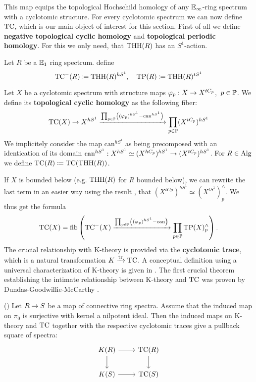 This map equips the topological Hochschild homology of any $\mathbb{E}_\infty$-ring spectrum with a cyclotomic structure. 
For every cyclotomic spectrum we can now define $\operatorname{TC}$, which is our main object of interest for this section.
First of all we define \textbf{negative topological cyclic homology} and \textbf{topological periodic  homology}. For this we only need, that $\operatorname{THH}(R)$ has an $S^1$-action.
\begin{defn}
    Let $R$ be a $\mathbb{E}_1$ ring spectrum. define
        \begin{equation*}
          \operatorname{TC}^{-}(R)\coloneqq \operatorname{THH}(R)^{hS^1},\quad   \operatorname{TP}(R)\coloneqq \operatorname{THH}(R)^{tS^1}
        \end{equation*} 
\end{defn}
\begin{defn}
    Let $X$ be a cyclotomic spectrum with structure maps $\varphi_p:X\rightarrow X^{tC_p}$,\ $p\in\mathbb{P}$. We define its \textbf{topological cyclic homology} as the following fiber:
    \begin{equation*}
        \operatorname{TC}(X)\rightarrow X^{hS^1}\xrightarrow{\prod_{p\in\mathbb{P}}\left( (\varphi_p)^{hS^1}-\textrm{can}^{hS^1} \right)}\prod_{p\in\mathbb{P}}(X^{tC_p})^{hS^1} 
    \end{equation*}
    We implicitely consider the map $\textrm{can}^{hS^1}$ as being precomposed with an identication of its domain $\textrm{can}^{hS^1}:X^{hS^1}\simeq (X^{hC_p})^{hS^1}\rightarrow(X^{tC_p})^{hS^1}$.
    For $R\in \operatorname{Alg}$ we define $\operatorname{TC}(R)\coloneqq \operatorname{TC}(\operatorname{THH}(R))$.
\end{defn}
If $X$ is bounded below (e.g. $\operatorname{THH}(R)$ for $R$ bounded below), we can rewrite the last term in an easier way using the result \cite[Lemma~II.4.2]{NS}, that $(X^{tCp})^{hS^1}\simeq (X^{tS^1})_p^{\wedge}$. We thus get the formula
\begin{equation*}
    \operatorname{TC}(X)=\operatorname{fib}\left(  \operatorname{TC}^{-}(X)\xrightarrow{\prod_{p\in\mathbb{P}}\left( (\varphi_p)^{hS^1}-\textrm{can} \right)}\prod_{p\in\mathbb{P}} \operatorname{TP}(X)^{\wedge}_p\right).
\end{equation*}
The crucial relationship with K-theory is provided via the \textbf{cyclotomic trace}, which is a natural transformation $K\xrightarrow{\operatorname{tr}} \operatorname{TC}$. A conceptual definition using a universal characterization of K-theory is given in \cite[Section~10.3]{BGTuniversal}.
The first crucial theorem establishing the intimate relationship between K-theory and $\operatorname{TC}$ was proven by Dundas-Goodwillie-McCarthy .
\begin{thm}(\cite[Theorem~7.2.2.1]{DundasGoodwillieMccarthyLocalstructure})
    Let $R\rightarrow S$ be a map of connective ring spectra. Assume that the induced map on $\pi_0$ is surjective with kernel a nilpotent ideal. Then the induced maps on K-theory and $\operatorname{TC}$ together with the respective cyclotomic traces give a pullback square of spectra:
    \[\begin{tikzcd}
        {K(R)} & {\mathrm{TC}(R)} \\
        {K(S)} & {\mathrm{TC}(S)}
        \arrow[from=1-1, to=1-2]
        \arrow[from=1-2, to=2-2]
        \arrow[from=1-1, to=2-1]
        \arrow[from=2-1, to=2-2]
    \end{tikzcd}\]
\end{thm}
